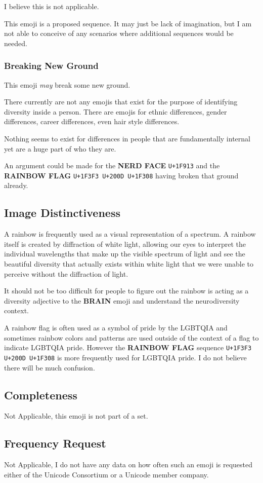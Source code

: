 I believe this is not applicable.

This emoji is a proposed sequence. It may just be lack of imagination, but I am not able to
conceive of any scenarios where additional sequences would be needed.

\subsubsection{Breaking New Ground}

This emoji \emph{may} break some new ground.

There currently are not any emojis that exist for the purpose of identifying diversity inside
a person. There are emojis for ethnic differences, gender differences, career differences,
even hair style differences.

Nothing seems to exist for differences in people that are fundamentally internal yet are a
huge part of who they are.

An argument could be made for the \textbf{NERD FACE} \texttt{U+1F913} and the
\textbf{RAINBOW FLAG} \texttt{U+1F3F3 U+200D U+1F308} having broken that ground already.

\subsection{Image Distinctiveness}

A rainbow is frequently used as a visual representation of a spectrum. A rainbow itself is
created by diffraction of white light, allowing our eyes to interpret the individual
wavelengths that make up the visible spectrum of light and see the beautiful diversity that
actually exists within white light that we were unable to perceive without the diffraction of
light.

It should not be too difficult for people to figure out the rainbow is acting as a diversity
adjective to the \textbf{BRAIN} emoji and understand the neurodiversity context.

A rainbow flag is often used as a symbol of pride by the LGBTQIA and sometimes rainbow colors
and patterns are used outside of the context of a flag to indicate LGBTQIA pride. However the
\textbf{RAINBOW FLAG} sequence \texttt{U+1F3F3 U+200D U+1F308} is more frequently used for
LGBTQIA pride. I do not believe there will be much confusion.

\subsection{Completeness}

Not Applicable, this emoji is not part of a set.

\subsection{Frequency Request}

Not Applicable, I do not have any data on how often such an emoji is requested either of the
Unicode Consortium or a Unicode member company.
